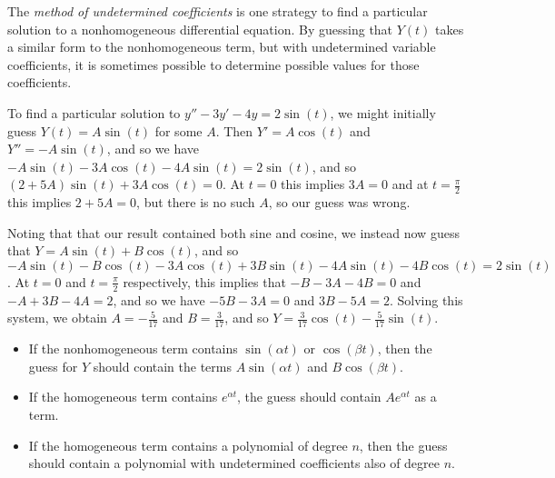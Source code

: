 \begin{defn}
    The \emph{method of undetermined coefficients} is one strategy to find a particular solution to a nonhomogeneous differential equation. By guessing that $Y(t)$ takes a similar form to the nonhomogeneous term, but with undetermined variable coefficients, it is sometimes possible to determine possible values for those coefficients.
\end{defn}

\begin{exmp}
    To find a particular solution to $y'' - 3y' - 4y = 2\sin(t)$, we might initially guess $Y(t) = A\sin(t)$ for some $A$. Then $Y' = A\cos(t)$ and $Y'' = -A\sin(t)$, and so we have $-A\sin(t) - 3A\cos(t) - 4A\sin(t) = 2\sin(t)$, and so $(2 + 5A)\sin(t) + 3A\cos(t) = 0$. At $t = 0$ this implies $3A = 0$ and at $t = \frac{\pi}{2}$ this implies $2 + 5A = 0$, but there is no such $A$, so our guess was wrong.

    Noting that that our result contained both sine and cosine, we instead now guess that $Y = A\sin(t) + B\cos(t)$, and so $-A\sin(t) - B\cos(t) - 3A\cos(t) + 3B\sin(t) - 4A\sin(t) - 4B\cos(t) = 2\sin(t)$. At $t = 0$ and $t = \frac{\pi}{2}$ respectively, this implies that $-B - 3A - 4B = 0$ and $-A + 3B - 4A = 2$, and so we have $-5B - 3A = 0$ and $3B - 5A = 2$. Solving this system, we obtain $A = -\frac{5}{17}$ and $B = \frac{3}{17}$, and so $Y = \frac{3}{17}\cos(t) - \frac{5}{17}\sin(t)$.
\end{exmp}

\begin{rmk}\proofbreak
    \begin{itemize}
        \item If the nonhomogeneous term contains $\sin(\alpha t)$ or $\cos(\beta t)$, then the guess for $Y$ should contain the terms $A\sin(\alpha t)$ and $B\cos(\beta t)$.
        \item If the homogeneous term contains $e^{\alpha t}$, the guess should contain $Ae^{\alpha t}$ as a term.
        \item If the homogeneous term contains a polynomial of degree $n$, then the guess should contain a polynomial with undetermined coefficients also of degree $n$.
    \end{itemize}
\end{rmk}

